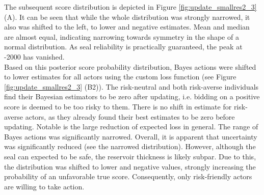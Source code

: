 				The subsequent score distribution is depicted in Figure \ref{fig:update_smallres2_3} (A). It can be seen that while the whole distribution was strongly narrowed, it also was shifted to the left, to lower and negative estimates. Mean and median are almost equal, indicating narrowing towards symmetry in the shape of a normal distribution. As seal reliability is practically guaranteed, the peak at -2000 has vanished.\\				
				Based on this posterior score probability distribution, Bayes actions were shifted to lower estimates for all actors using the custom loss function (see Figure \ref{fig:update_smallres2_3} (B2)). The risk-neutral and both risk-averse individuals find their Bayesian estimators to be zero after updating, i.e. bidding on a positive score is deemed to be too risky to them. There is no shift in estimate for risk-averse actors, as they already found their best estimates to be zero before updating. Notable is the large reduction of expected loss in general. The range of Bayes actions was significantly narrowed. Overall, it is apparent that uncertainty was significantly reduced (see the narrowed distribution). However, although the seal can expected to be safe, the reservoir thickness is likely subpar. Due to this, the distribution was shifted to lower and negative values, strongly increasing the probability of an unfavorable true score. Consequently, only risk-friendly actors are willing to take action.
